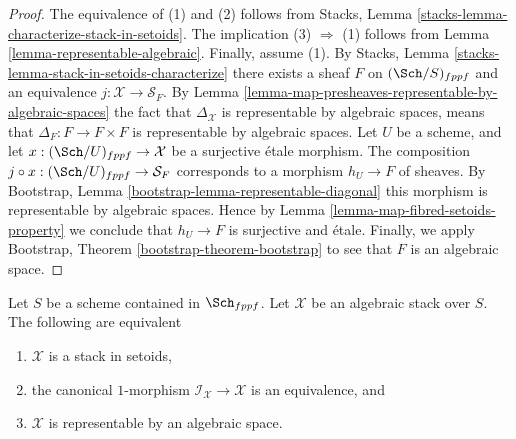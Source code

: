 \begin{proof}
The equivalence of (1) and (2) follows from
Stacks, Lemma \ref{stacks-lemma-characterize-stack-in-setoids}.
The implication (3) $\Rightarrow$ (1) follows from
Lemma \ref{lemma-representable-algebraic}.
Finally, assume (1). By
Stacks, Lemma \ref{stacks-lemma-stack-in-setoids-characterize}
there exists a sheaf $F$ on $(\Sch/S)_{fppf}$
and an equivalence $j : \mathcal{X} \to \mathcal{S}_F$. By
Lemma \ref{lemma-map-presheaves-representable-by-algebraic-spaces}
the fact that $\Delta_\mathcal{X}$ is representable by algebraic
spaces, means that $\Delta_F : F \to F \times F$
is representable by algebraic spaces.
Let $U$ be a scheme, and let $x : (\Sch/U)_{fppf} \to \mathcal{X}$
be a surjective \'etale morphism. The composition
$j \circ x : (\Sch/U)_{fppf} \to \mathcal{S}_F$
corresponds to a morphism $h_U \to F$ of sheaves. By
Bootstrap, Lemma \ref{bootstrap-lemma-representable-diagonal}
this morphism is representable by algebraic spaces.
Hence by
Lemma \ref{lemma-map-fibred-setoids-property}
we conclude that $h_U \to F$ is surjective and \'etale.
Finally, we apply
Bootstrap, Theorem \ref{bootstrap-theorem-bootstrap}
to see that $F$ is an algebraic space.
\end{proof}

\begin{proposition}
\label{proposition-algebraic-stack-no-automorphisms}
Let $S$ be a scheme contained in $\Sch_{fppf}$.
Let $\mathcal{X}$ be an algebraic stack over $S$.
The following are equivalent
\begin{enumerate}
\item $\mathcal{X}$ is a stack in setoids,
\item the canonical $1$-morphism $\mathcal{I}_\mathcal{X} \to \mathcal{X}$
is an equivalence, and
\item $\mathcal{X}$ is representable by an algebraic space.
\end{enumerate}
\end{proposition}


